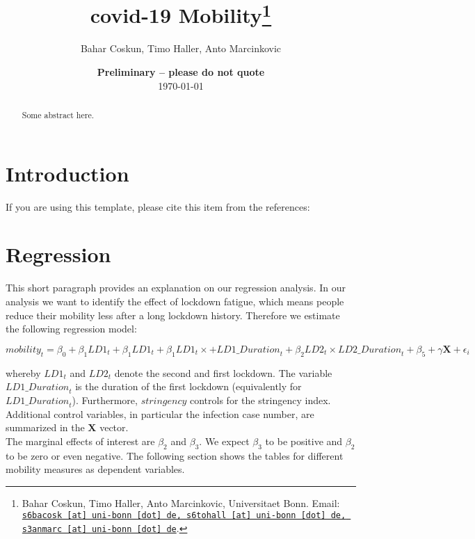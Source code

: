 \documentclass[11pt, a4paper, leqno]{article}
\begin{document}
\title{covid-19 Mobility\thanks{Bahar Coskun, Timo Haller, Anto Marcinkovic, Universitaet Bonn. Email: \href{mailto:s6bacosk@uni-bonn.de, s6tohall@uni-bonn.de, s3anmarc@uni-bonn.de}{\nolinkurl{s6bacosk [at] uni-bonn [dot] de, s6tohall [at] uni-bonn [dot] de, s3anmarc [at] uni-bonn [dot] de}}.}}

\author{Bahar Coskun, Timo Haller, Anto Marcinkovic}

\date{
    {\bf Preliminary -- please do not quote}
    \\[1ex]
    \today
}

\maketitle


\begin{abstract}
    Some abstract here.
\end{abstract}
\clearpage

\tableofcontents
\clearpage

\section{Introduction} %
\label{sec:introduction}

If you are using this template, please cite this item from the references: \citet{GaudeckerEconProjectTemplates}

\newpage

\section{Regression}

This short paragraph provides an explanation on our regression analysis.
In our analysis we want to identify the effect of lockdown fatigue, which means people reduce their mobility less after a long lockdown history.
Therefore we estimate the following regression model:


$\textit{mobility}_{t} = \beta_{0} + \beta_{1} \textit{LD1}_{t} + \beta_{1} \textit{LD1}_{t} + \beta_{1} \textit{LD1}_{t} \times + \textit{LD1\_Duration}_{t} + \beta_{2} \textit{LD2}_{t} \times \textit{LD2\_Duration}_{t} + \beta_{5} + \gamma \mathbf{X} + \epsilon_{i}$

whereby $\textit{LD1}_{t} $ and $\textit{LD2}_{t}$ denote the second and first lockdown. The variable $\textit{LD1\_Duration}_{t}$ is the duration of the first lockdown (equivalently for $\textit{LD1\_Duration}_{t}$). Furthermore, $\textit{stringency}$ controls for the stringency index. Additional control variables, in particular the infection case number, are summarized in the $\mathbf{X}$ vector. \\
The marginal effects of interest are $\beta_{2}$ and $\beta_{3}$. We expect $\beta_{3}$ to be positive and $\beta_{2}$ to be zero or even negative. The following section shows the tables for different mobility measures as dependent variables.
\end{document}

